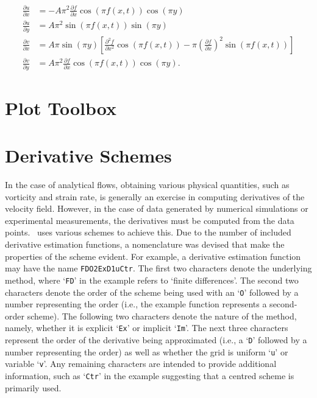 \documentclass[10pt, twoside]{book}
\begin{document}
			\begin{subequations}
			\label{eq:DoubleGyreVgt}
				\begin{align}
					\frac{\partial u}{\partial x} &= -A\pi^2\frac{\partial f}{\partial x}\cos\left({\pi}f\left(x,t\right)\right)\cos\left({\pi}y\right)\label{eq:DoubleGyreVgtUx}\\
					\frac{\partial u}{\partial y} &= A\pi^2\sin\left({\pi}f\left(x,t\right)\right)\sin\left({\pi}y\right)\label{eq:DoubleGyreVgtUy}\\
					\frac{\partial v}{\partial x} &= A\pi\sin\left({\pi}y\right)\left[\frac{\partial^2 f}{\partial x^2}\cos\left({\pi}f\left(x,t\right)\right) - \pi\left(\frac{\partial f}{\partial x}\right)^2\sin\left({\pi}f\left(x,t\right)\right)\right]\label{eq:DoubleGyreVgtVx}\\
					\frac{\partial v}{\partial y} &= A\pi^2\frac{\partial f}{\partial x}\cos\left({\pi}f\left(x,t\right)\right)\cos\left({\pi}y\right).\label{eq:DoubleGyreVgtVy}
				\end{align}
			\end{subequations}
			
	\chapter{\label{chp:Plots}Plot Toolbox}
		
	\chapter{\label{chp:DerivSchemes}Derivative Schemes}
		
		In the case of analytical flows, obtaining various physical quantities, such as vorticity and strain rate, is generally an exercise in computing derivatives of the velocity field. However, in the case of data generated by numerical simulations or experimental measurements, the derivatives must be computed from the data points. \MATfluids\ uses various schemes to achieve this. Due to the number of included derivative estimation functions, a nomenclature was devised that make the properties of the scheme evident. For example, a derivative estimation function may have the name \texttt{FDO2ExD1uCtr}. The first two characters denote the underlying method, where `\texttt{FD}' in the example refers to `finite differences'. The second two characters denote the order of the scheme being used with an `\texttt{O}' followed by a number representing the order (i.e., the example function represents a second-order scheme). The following two characters denote the nature of the method, namely, whether it is explicit `\texttt{Ex}' or implicit `\texttt{Im}'. The next three characters represent the order of the derivative being approximated (i.e., a `\texttt{D}' followed by a number representing the order) as well as whether the grid is uniform `\texttt{u}' or variable `\texttt{v}'. Any remaining characters are intended to provide additional information, such as `\texttt{Ctr}' in the example suggesting that a centred scheme is primarily used.
		
\end{document}
